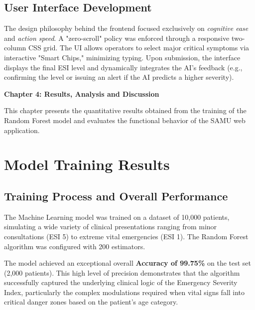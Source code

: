 \documentclass[a4paper,12pt,oneside]{report}
\begin{document}
\subsection{User Interface Development}
The design philosophy behind the frontend focused exclusively on \textit{cognitive ease} and \textit{action speed}. A "zero-scroll" policy was enforced through a responsive two-column CSS grid. The UI allows operators to select major critical symptoms via interactive "Smart Chips," minimizing typing. Upon submission, the interface displays the final ESI level and dynamically integrates the AI's feedback (e.g., confirming the level or issuing an alert if the AI predicts a higher severity).

\clearpage

\newpage
\thispagestyle{fancy}
{\LARGE \bfseries \noindent Chapter 4: Results, Analysis and Discussion}
\vspace{2em}
\renewcommand{\thesection}{\Roman{section}}
\justifying

This chapter presents the quantitative results obtained from the training of the Random Forest model and evaluates the functional behavior of the SAMU web application. 

\section{Model Training Results}

\subsection{Training Process and Overall Performance}
The Machine Learning model was trained on a dataset of 10,000 patients, simulating a wide variety of clinical presentations ranging from minor consultations (ESI 5) to extreme vital emergencies (ESI 1). The Random Forest algorithm was configured with 200 estimators.

The model achieved an exceptional overall \textbf{Accuracy of 99.75\%} on the test set (2,000 patients). This high level of precision demonstrates that the algorithm successfully captured the underlying clinical logic of the Emergency Severity Index, particularly the complex modulations required when vital signs fall into critical danger zones based on the patient's age category.
\end{document}
